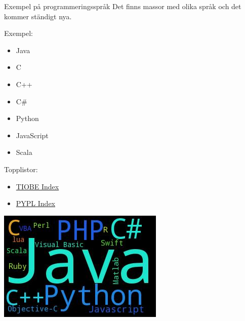 \begin{Slide}{Exempel på programmeringsspråk}
Det finns massor med olika språk och det kommer ständigt nya. 
\vspace{1em}
\begin{multicols}{2}
Exempel:
\begin{itemize}
\item Java
\item C
\item C++
\item C\#
\item Python
\item JavaScript
\item Scala
\end{itemize}

\columnbreak %

Topplistor:
\begin{itemize}
\item \href{http://www.tiobe.com/index.php/content/paperinfo/tpci/index.html}{TIOBE Index}
\item \href{http://pypl.github.io/PYPL.html}{PYPL Index}
\end{itemize}
\vspace{1em}
\includegraphics[width=0.8\columnwidth]{../img/pypl}
\end{multicols}

\end{Slide}

